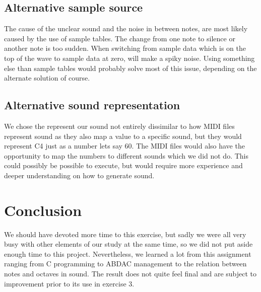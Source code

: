 \documentclass[12pt,a4paper,final]{report}
\numberwithin{equation}{section}
\numberwithin{table}{section}
\numberwithin{figure}{section}
\begin{document}
\subsection{Alternative sample source}
\label{sec:alternativesamplesource}
The cause of the unclear sound and the noise in between notes, are most likely caused by the use of sample tables. The change from one note to silence or another note is too sudden. When switching from sample data which is on the top of the wave to sample data at zero, will make a spiky noise. Using something else than sample tables would probably solve most of this issue, depending on the alternate solution of course.

\subsection{Alternative sound representation}
\label{sec:alternativesoundrepresentation}
We chose the represent our sound not entirely dissimilar to how MIDI files represent sound as they also map a value to a specific sound, but they would represent C4 just as a number lets say 60. The MIDI files would also have the opportunity to map the numbers to different sounds which we did not do. This could possibly be possible to execute, but would require more experience and deeper understanding on how to generate sound.

\newpage

\section{Conclusion}
\label{sec:conclusion}
We should have devoted more time to this exercise, but sadly we were all very busy with other elements of our study at the same time, so we did not put aside enough time to this project. Nevertheless, we learned a lot from this assignment ranging from C programming to ABDAC management to the relation between notes and octaves in sound. The result does not quite feel final and are subject to improvement prior to its use in exercise 3. 




\end{document}
